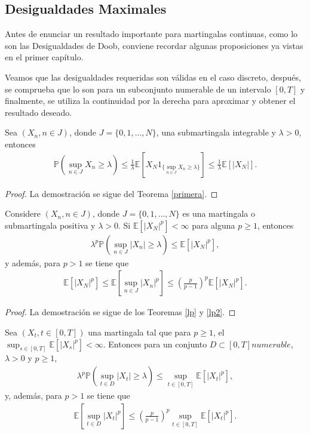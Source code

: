 \subsection{Desigualdades Maximales}
Antes de enunciar un resultado importante para martingalas continuas, como lo son las Desigualdades de Doob, conviene recordar algunas proposiciones ya vistas en el primer capítulo.

Veamos que las desigualdades requeridas son válidas en el caso discreto, después, se comprueba que lo son para un subconjunto numerable de un intervalo $[0, T]$ y finalmente, se utiliza la continuidad por la derecha para aproximar y obtener el resultado deseado.

\begin{proposition}
	Sea $(X_n, n \in J)$, donde $J = \{0, 1, \ldots, N\}$, una submartingala integrable y $\lambda > 0$, entonces
    \begin{align*}
		\mathbb{P} \left( \sup_{n \in J} X_n \geq \lambda \right) \leq \frac{1}{\lambda} \mathbb{E}\left[ X_N 1_{\{ \sup_{n \in J} X_n \geq \lambda\}} \right] \leq \frac{1}{\lambda} \mathbb{E}\left[ |X_N| \right].
	\end{align*}
\end{proposition}
\begin{proof}
	La demostración se sigue del Teorema \ref{primera}.
\end{proof}

\begin{proposition}
	Considere $(X_n, n \in J)$, donde $J = \{0, 1, \ldots, N\}$ es una martingala o submartingala positiva y $\lambda > 0$. Si $\mathbb{E}[|X_N|^p] < \infty$ para alguna $p \geq 1$, entonces
    \begin{align*}
		\lambda^p \mathbb{P} \left( \sup_{n \in J} |X_n| \geq \lambda \right) \leq \mathbb{E}[|X_N|^p],
	\end{align*}
y además, para $p > 1$ se tiene que
	\begin{align*}
		\mathbb{E} [|X_N|^p] \leq \mathbb{E} \left[ \sup_{n \in J} |X_n|^p \right] \leq \left( \frac{p}{p-1} \right)^p \mathbb{E}[|X_N|^p].
	\end{align*}
\end{proposition}
\begin{proof}
	La demostración se sigue de los Teoremas \ref{lp} y \ref{lp2}.
\end{proof}

\begin{proposition}
\label{lp3}
	Sea $(X_t, t \in [0, T])$ una martingala tal que para $p \geq 1$, el $\sup_{s \in [0, T]} \mathbb{E}[|X_s|^p] < \infty$. Entonces para un conjunto $D \subset [0, T] numerable$, $\lambda > 0$ y $p \geq 1$,
    \begin{align*}
    \lambda^p \mathbb{P} \left( \sup_{t \in D} |X_t| \geq \lambda \right)  \leq \sup_{t \in [0, T]} \mathbb{E}[|X_t|^p], 
    \end{align*}
y, además, para $p > 1$ se tiene que
	\begin{align*}
	\mathbb{E} \left[ \sup_{t \in D} |X_t|^p \right] \leq \left( \frac{p}{p-1} \right)^p \sup_{t \in [0, T]} \mathbb{E}[|X_t|^p].
	\end{align*}
\end{proposition}

